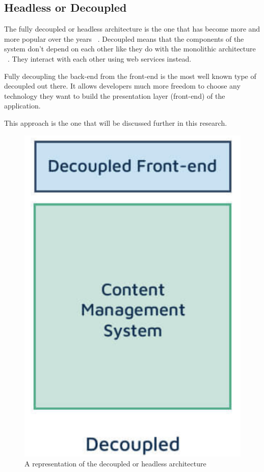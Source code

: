 
\subsection{Headless or Decoupled}

The fully decoupled or headless architecture is the one that has become more and more popular over the years ~\autocite{Dropsolid2021}. Decoupled means that the components of the system don't depend on each other like they do with the monolithic architecture ~\autocite{So2018}. They interact with each other using web services instead.

Fully decoupling the back-end from the front-end is the most well known type of decoupled out there. It allows developers much more freedom to choose any technology they want to build the presentation layer (front-end) of the application.

This approach is the one that will be discussed further in this research.

\begin{figure}
	\centering
	\includegraphics{./img/Headless_Architecture}
	\caption[Headless CMS architecture]{A representation of the decoupled or headless architecture ~\autocite{Dropsolid2021}}
\end{figure}

